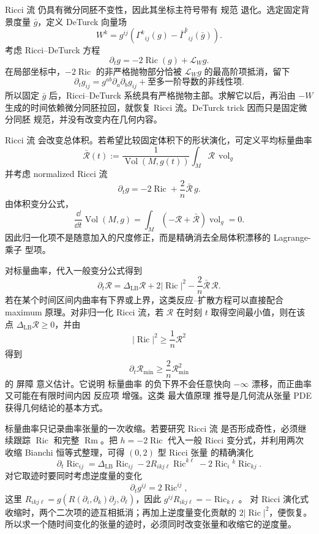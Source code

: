 Ricci 流 仍具有微分同胚不变性，因此其坐标主符号带有 规范 退化。选定固定背景度量 $\bar g$，定义 DeTurck 向量场
\begin{equation*}W^k
=g^{ij}\left(\Gamma^k{}_{ij}(g)-\bar\Gamma^k{}_{ij}(\bar g)\right).
\end{equation*}
考虑 Ricci--DeTurck 方程
\begin{equation*}{
\partial_tg=-2\operatorname{Ric}(g)+\mathcal L_Wg.}
\end{equation*}
在局部坐标中，$-2\operatorname{Ric}$ 的非严格抛物部分恰被 $\mathcal L_Wg$ 的最高阶项抵消，留下
\[
\partial_tg_{ij}
=g^{ab}\partial_a\partial_bg_{ij}
+\text{至多一阶导数的非线性项}.
\]
所以固定 $\bar g$ 后，Ricci--DeTurck 系统具有严格抛物主部。求解它以后，再沿由 $-W$ 生成的时间依赖微分同胚拉回，就恢复 Ricci 流。DeTurck trick 因而只是固定微分同胚 规范，并没有改变内在几何内容。

Ricci 流 会改变总体积。若希望比较固定体积下的形状演化，可定义平均标量曲率
\[
\bar{\mathcal R}(t)
:=\frac{1}{\operatorname{Vol}(M,g(t))}
\int_M\mathcal R\,\operatorname{vol}_g
\]
并考虑 normalized Ricci 流
\begin{equation*}{
\partial_tg
=-2\operatorname{Ric}+\frac{2}{n}\bar{\mathcal R}\,g
}.\end{equation*}
由体积变分公式，
\[
\frac{\dd}{\dd t}\operatorname{Vol}(M,g)
=\int_M
\left(-\mathcal R+\bar{\mathcal R}\right)\operatorname{vol}_g=0.
\]
因此归一化项不是随意加入的尺度修正，而是精确消去全局体积漂移的 Lagrange-乘子 型项。

对标量曲率，代入一般变分公式得到
\begin{equation*}\partial_t\mathcal R
=\Delta_{\mathrm{LB}}\mathcal R
+2|\operatorname{Ric}|^2
-\frac{2}{n}\bar{\mathcal R}\,\mathcal R.\end{equation*}
若在某个时间区间内曲率有下界或上界，这类反应--扩散方程可以直接配合 maximum 原理。对非归一化 Ricci 流，若 $\mathcal R$ 在时刻 $t$ 取得空间最小值，则在该点 $\Delta_{\mathrm{LB}}\mathcal R\ge0$，并由
\[
|\operatorname{Ric}|^2\ge\frac1n\mathcal R^2
\]
得到
\[
\partial_t\mathcal R_{\min}
\ge\frac{2}{n}\mathcal R_{\min}^2
\]
的 屏障 意义估计。它说明 标量曲率 的负下界不会任意快向 $-\infty$ 漂移，而正曲率又可能在有限时间内因 反应项 增强。这类 最大值原理 推导是几何流从张量 PDE 获得几何结论的基本方式。

标量曲率只记录曲率张量的一次收缩。若要研究 Ricci 流 是否形成奇性，必须继续跟踪 $\operatorname{Ric}$ 和完整 $\operatorname{Rm}$。把 $h=-2\operatorname{Ric}$ 代入一般 Ricci 变分式，并利用两次 收缩 Bianchi 恒等式整理，可得 $(0,2)$ 型 Ricci 张量 的精确演化
\begin{equation*}{
\partial_t\operatorname{Ric}_{ij}
=\Delta_{\mathrm{LB}}\operatorname{Ric}_{ij}
-2R_{ikj\ell}\operatorname{Ric}^{k\ell}
-2\operatorname{Ric}_i{}^k\operatorname{Ric}_{kj}.
}\end{equation*}
对它取迹时要同时考虑逆度量的变化
\[
\partial_tg^{ij}=2\operatorname{Ric}^{ij},
\]
这里 $R_{ikj\ell}=g(R(\partial_i,\partial_k)\partial_j,\partial_\ell)$，因此 $g^{ij}R_{ikj\ell}=-\operatorname{Ric}_{k\ell}$。
对 Ricci 演化式收缩时，两个二次项的迹互相抵消；再加上逆度量变化贡献的 $2|\operatorname{Ric}|^2$，便恢复。
所以求一个随时间变化的张量的迹时，必须同时改变张量和收缩它的逆度量。

